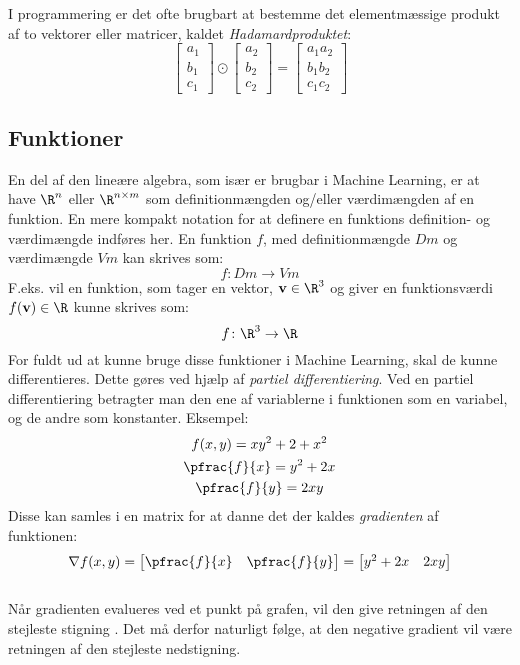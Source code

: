 \documentclass[../SOP.tex]{subfile}
\begin{document}
I programmering er det ofte brugbart at bestemme det elementmæssige produkt af to vektorer eller matricer, kaldet \emph{Hadamardproduktet}:
\begin{equation*}
  \begin{bmatrix}
  a_1 \\ b_1 \\ c_1
  \end{bmatrix}
  \odot
  \begin{bmatrix}
    a_2 \\ b_2 \\ c_2
  \end{bmatrix}
  =
  \begin{bmatrix}
    a_1a_2 \\ b_1b_2 \\ c_1c_2
  \end{bmatrix}
\end{equation*}
\parencite[pp. 22-23]{mml}


\subsection{Funktioner}
En del af den lineære algebra, som især er brugbar i Machine Learning, er at have $\R^n$ eller $\R^{n\times m}$ som definitionmængden og/eller værdimængden af en funktion. En mere kompakt notation for at definere en funktions definition- og værdimængde indføres her. En funktion $f$, med definitionmængde $Dm$ og værdimængde $Vm$ kan skrives som:
\begin{equation*}
  f\colon Dm \rightarrow Vm
\end{equation*}
F.eks. vil  en funktion, som tager en vektor, $\mathbf{v}\in\R^3$ og giver en funktionsværdi $f(\mathbf{v})\in\R$ kunne skrives som:
\begin{equation*}
  f\colon \R^3 \rightarrow \R
\end{equation*}
For fuldt ud at kunne bruge disse funktioner i Machine Learning, skal de kunne differentieres. Dette gøres ved hjælp af \emph{partiel differentiering}. Ved en partiel differentiering betragter man den ene af variablerne i funktionen som en variabel, og de andre som konstanter. Eksempel:
\begin{gather*}
  f(x,y)=xy^2+2+x^2\\
  \pfrac{f}{x}=y^2+2x\\
  \pfrac{f}{y}=2xy
\end{gather*}
Disse kan samles i en matrix for at danne det der kaldes \emph{gradienten} af funktionen:
\begin{equation*}
  \nabla f(x,y) = \begin{bmatrix}
    \pfrac{f}{x} & \pfrac{f}{y}
  \end{bmatrix}
  =
  \begin{bmatrix}
    y^2+2x & 2xy
  \end{bmatrix}
\end{equation*}
\parencite{mml}\\
Når gradienten evalueres ved et punkt på grafen, vil den give retningen af den stejleste stigning \parencite{gradient}. Det må derfor naturligt følge, at den negative gradient vil være retningen af den stejleste nedstigning.
\end{document}

